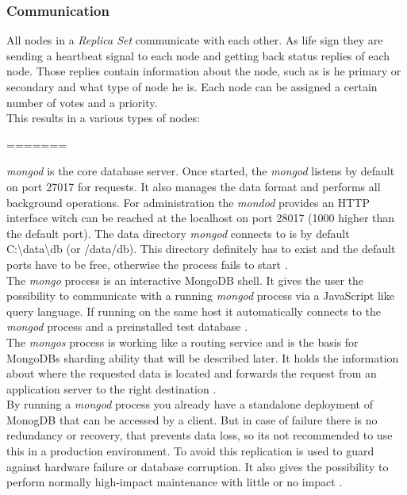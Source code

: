 \subsubsection{Communication}
All nodes in a \textit{Replica Set} communicate with each other. As life sign they are sending a heartbeat signal to each node and getting back status replies of each node. Those replies contain information about the node, such as is he primary or secondary and what type of node he is. Each node can be assigned a certain number of votes and a priority.\\
This results in a various types of nodes:
\begin{itemize}
=======
\end{itemize}
\textit{mongod} is the core database server. Once started, the \textit{mongod} listens by default on port 27017 for requests. It also manages the data format and performs all background operations. For administration the \textit{mondod} provides an HTTP interface witch can be reached at the localhost on port 28017 (1000 higher than the default port). The data directory \textit{mongod} connects to is by default C:\textbackslash data\textbackslash db (or /data/db). This directory definitely has to exist and the default ports have to be free, otherwise the process fails to start \cite{pracmong}.\\
The \textit{mongo} process is an interactive MongoDB shell. It gives the user the possibility to communicate with a running \textit{mongod} process via a JavaScript like query language. If running on the same host it automatically connects to the \textit{mongod} process and a preinstalled test database \cite{pracmong}.\\
The \textit{mongos} process is working like a routing service and is the basis for MongoDBs sharding ability that will be described later. It holds the information about where the requested data is located and forwards the request from an application server to the right destination \cite{pracmong}. \\
By running a \textit{mongod} process you already have a standalone deployment of MonogDB that can be accessed by a client. But in case of failure there is no redundancy or recovery, that prevents data loss, so its not recommended to use this in a production environment. To avoid this replication is used to guard against hardware failure or database corruption. It also gives the possibility to perform normally high-impact maintenance with little or no impact \cite{theguide}.

